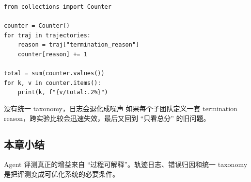 \begin{lstlisting}[caption={聚合 Agent 失败模式的最小示例}]
from collections import Counter

counter = Counter()
for traj in trajectories:
    reason = traj["termination_reason"]
    counter[reason] += 1

total = sum(counter.values())
for k, v in counter.items():
    print(k, f"{v/total:.2%}")
\end{lstlisting}

\begin{warningbox}{没有统一 taxonomy，日志会退化成噪声}
如果每个子团队定义一套 termination reason，跨实验比较会迅速失效，最后又回到 ``只看总分'' 的旧问题。
\end{warningbox}

\subsection{本章小结}
Agent 评测真正的增益来自 ``过程可解释''。轨迹日志、错误归因和统一 taxonomy 是把评测变成可优化系统的必要条件。


